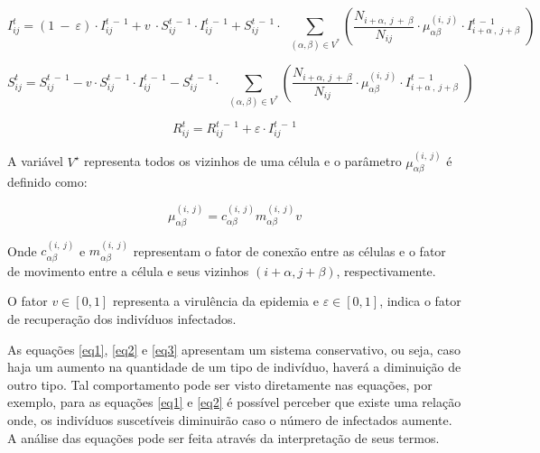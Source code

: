 \documentclass[a4paper,12pt]{article}
\begin{document}
\begin{equation} 
I_{ij}^t=\left(1\:-\:\varepsilon \right)\cdot I_{ij}^{t\:-\:1}+v\:\cdot S_{ij}^{t\:-\:1}\cdot I_{ij}^{t\:-\:1}+S_{ij}^{t\:-\:1}\cdot \:\displaystyle \:\sum _{\left(\alpha ,\beta \right)\in V^{\ast }}^{ }\left(\frac{N_{i+\alpha ,\:j\:+\:\beta }}{N_{ij}}\cdot \mu _{\alpha \beta }^{\left(i,\:j\right)}\cdot I_{i+\alpha \:,\:j+\beta \:}^{t\:-\:1}\:\right)
\label{eq1}
\end{equation}

\begin{equation}
S_{ij}^t=S_{ij}^{t\:-\:1}-v\cdot S_{ij}^{t\:-\:1}\cdot I_{ij}^{t\:-\:1}-S_{ij}^{t\:-\:1}\cdot \:\displaystyle \:\sum _{\left(\alpha ,\beta \right)\in V^{\ast }}^{ }\left(\frac{N_{i+\alpha ,\:j\:+\:\beta }}{N_{ij}}\cdot \mu _{\alpha \beta }^{\left(i,\:j\right)}\cdot I_{i+\alpha \:,\:j+\beta \:}^{t\:-\:1}\:\right)
\label{eq2}
\end{equation}

\begin{equation} 
R_{ij}^t=R_{ij}^{t\:-\:1}+\varepsilon \cdot I_{ij}^{t\:-\:1}
\label{eq3}
\end{equation}

A variável $V^\star$ representa todos os vizinhos de uma célula e o parâmetro $\mu_{\alpha \beta}^{\left(i,\:j\right)}$ é definido como:

\begin{equation}
   \mu_{\alpha \beta}^{\left(i,\:j\right)} = c_{\alpha\beta}^{\left(i,\:j\right)} m_{\alpha \beta}^{\left(i,\:j\right)} v
\end{equation}

Onde $c_{\alpha \beta}^{\left(i,\:j\right)}$ e $ m_{\alpha \beta}^{\left(i,\:j\right)}$ representam o fator de conexão entre as células e o fator de movimento entre a célula e seus vizinhos $(i + \alpha, j + \beta)$, respectivamente. 

O fator $v \in [0, 1]$ representa a virulência da epidemia e $\varepsilon \in [0, 1]$, indica o fator de recuperação dos indivíduos infectados.

As equações \ref{eq1}, \ref{eq2} e \ref{eq3} apresentam um sistema conservativo, ou seja, caso haja um aumento na quantidade de um tipo de indivíduo, haverá a diminuição de outro tipo. Tal comportamento pode ser visto diretamente nas equações, por exemplo, para as equações \ref{eq1} e \ref{eq2} é possível perceber que existe uma relação onde, os indivíduos suscetíveis diminuirão caso o número de infectados aumente. A análise das equações pode ser feita através da interpretação de seus termos. 
\end{document}
